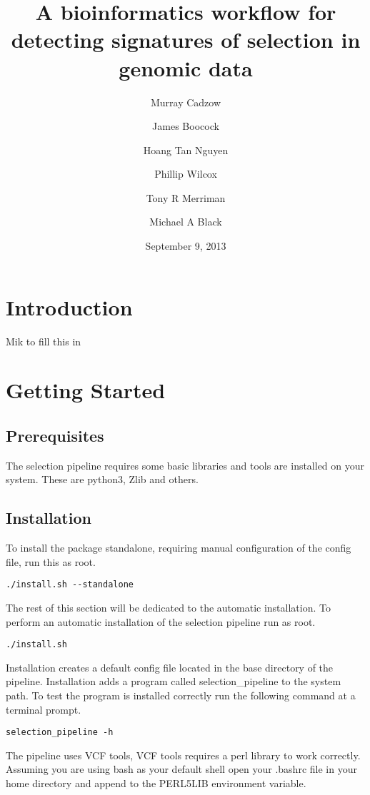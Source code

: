 \documentclass[a4paper,10pt]{article}
\title{\textbf{A bioinformatics workflow for detecting signatures of selection in genomic data}}
\date{September 9, 2013}
\author[1,2]{Murray Cadzow}
\author[1,2]{James Boocock}
\author[1,2]{Hoang Tan Nguyen}
\author[2,3]{Phillip Wilcox}
\author[1]{Tony R Merriman}
\author[1]{Michael A Black}
\affil[1]{Department of Biochemistry, University of Otago}
\affil[2]{Department of Mathematics and Statistics, University of Otago}
\affil[3]{Scion Research, Rotorua, New Zealand}
\begin{document}
\maketitle{}
\doublespacing
\tableofcontents





\section{Introduction}
Mik to fill this in
\section{Getting Started}
\subsection{Prerequisites}
The selection pipeline requires some basic libraries and tools are installed on your system. These are python3, Zlib and others.
\subsection{Installation}
To install the package standalone, requiring manual configuration of the config file, run this as root.

\begin{verbatim}
./install.sh --standalone
\end{verbatim}

The rest of this section will be dedicated to the automatic installation. To perform an automatic installation of the selection pipeline run as root.
\begin{verbatim}
./install.sh
\end{verbatim}

Installation creates a default config file located in the base directory of the pipeline. Installation adds a program called selection\_pipeline to the system path. To test the program is installed correctly run the following command at a terminal prompt.

\begin{verbatim}
selection_pipeline -h
\end{verbatim}

The pipeline uses VCF tools, VCF tools requires a perl library to work correctly. Assuming you are using bash as your default shell open your .bashrc file in your home directory and append to the PERL5LIB environment variable.
\end{document}
